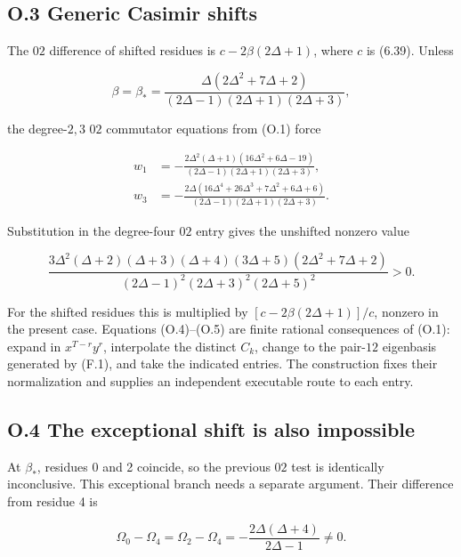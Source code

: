 \documentclass[a4paper,11pt]{article}
\numberwithin{equation}{section}
\begin{document}
\hypertarget{o.3-generic-casimir-shifts}{%
\subsection{O.3 Generic Casimir shifts}\label{o.3-generic-casimir-shifts}}

The \(02\) difference of shifted residues is \(c-2\beta(2\Delta+1)\), where \(c\) is (6.39). Unless

\[
\beta=\beta_*=
\frac{\Delta(2\Delta^2+7\Delta+2)}{(2\Delta-1)(2\Delta+1)(2\Delta+3)},
\tag{O.3}
\]

the degree-\(2,3\) \(02\) commutator equations from (O.1) force

\[
\begin{aligned}
w_1&=-\frac{2\Delta^2(\Delta+1)(16\Delta^2+6\Delta-19)}
{(2\Delta-1)(2\Delta+1)(2\Delta+3)},\\
w_3&=-\frac{2\Delta(16\Delta^4+26\Delta^3+7\Delta^2+6\Delta+6)}
{(2\Delta-1)(2\Delta+1)(2\Delta+3)}.
\end{aligned}
\tag{O.4}
\]

Substitution in the degree-four \(02\) entry gives the unshifted nonzero value

\[
\frac{3\Delta^2(\Delta+2)(\Delta+3)(\Delta+4)(3\Delta+5)(2\Delta^2+7\Delta+2)}
{(2\Delta-1)^2(2\Delta+3)^2(2\Delta+5)^2}>0.
\tag{O.5}
\]

For the shifted residues this is multiplied by \([c-2\beta(2\Delta+1)]/c\), nonzero in the present case. Equations (O.4)--(O.5) are finite rational consequences of (O.1): expand in \(x^{T-r}y^r\), interpolate the distinct \(C_k\), change to the pair-\(12\) eigenbasis generated by (F.1), and take the indicated entries. The construction fixes their normalization and supplies an independent executable route to each entry.

\hypertarget{o.4-the-exceptional-shift-is-also-impossible}{%
\subsection{O.4 The exceptional shift is also impossible}\label{o.4-the-exceptional-shift-is-also-impossible}}

At \(\beta_*\), residues 0 and 2 coincide, so the previous \(02\) test is identically inconclusive. This exceptional branch needs a separate argument. Their difference from residue 4 is

\[
\Omega_0-\Omega_4=\Omega_2-\Omega_4
=-\frac{2\Delta(\Delta+4)}{2\Delta-1}\ne0.
\tag{O.6}
\]
\end{document}
